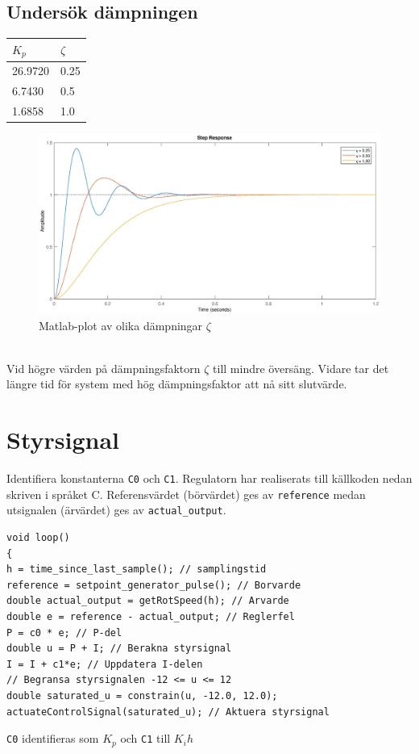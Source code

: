 \documentclass[11pt]{article}
\begin{document}
\subsection{Undersök dämpningen}
\begin{tabular}{|l|l|}
\hline
$K_p$&$\zeta$ \hspace*{1em} \\ \hline \hline 
26.9720 & 0.25 \\ \hline
6.7430&0.5\\ \hline
1.6858&1.0\\ \hline
\end{tabular}
\begin{figure}[h!]
\centering
\includegraphics[scale=0.45]{Figures/plot2}
\caption{Matlab-plot av olika dämpningar $\zeta$}
\end{figure}\\[1em]
Vid högre värden på dämpningsfaktorn $\zeta$ till mindre översäng. Vidare tar det längre tid för system med hög dämpningsfaktor att nå sitt slutvärde.
\newpage
\section{Styrsignal}
Identifiera konstanterna \texttt{C0} och \texttt{C1}. Regulatorn har realiserats till källkoden nedan skriven i språket C. Referensvärdet (börvärdet) ges av \texttt{reference} medan utsignalen (ärvärdet) ges av \texttt{actual\_output}.

\begin{lstlisting}[frame=single]
void loop()
{
h = time_since_last_sample(); // samplingstid
reference = setpoint_generator_pulse(); // Borvarde
double actual_output = getRotSpeed(h); // Arvarde
double e = reference - actual_output; // Reglerfel
P = c0 * e; // P-del
double u = P + I; // Berakna styrsignal
I = I + c1*e; // Uppdatera I-delen
// Begransa styrsignalen -12 <= u <= 12
double saturated_u = constrain(u, -12.0, 12.0);
actuateControlSignal(saturated_u); // Aktuera styrsignal
\end{lstlisting} \vspace*{1em}

\texttt{C0} identifieras som $K_p$ och \texttt{C1} till $K_ih$
\end{document}
